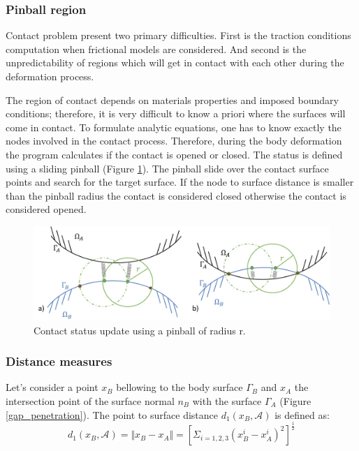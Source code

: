 
\subsubsection*{Pinball region}

Contact problem present two primary difficulties. First is the traction conditions computation when frictional models are considered. And second is the unpredictability of regions which will get in contact with each other during the deformation process.

The region of contact depends on materials properties and imposed boundary conditions; therefore, it is very difficult to know a priori where the surfaces will come in contact. To formulate analytic equations, one has to know exactly the nodes involved in the contact process. Therefore, during the body deformation the program calculates if the contact is opened or closed. The status is defined using a sliding pinball (Figure \ref{pinball}). The pinball slide over the contact surface points and search for the target surface. If the node to surface distance is smaller than the pinball radius the contact is considered closed otherwise the contact is considered opened.   

 \begin{center}
\begin{figure}
\centerline{\includegraphics[width=1\textwidth,keepaspectratio]{figures/pinball.jpg} }
\caption{Contact status update using a pinball of radius r.}
\label{pinball}
\end{figure}
\end{center}
 
 \subsubsection*{Distance measures} 
  Let's consider a point $x_B$ bellowing to the body surface $\Gamma_B$ and $x_A$ the intersection point of the surface normal $n_B$ with the surface $\Gamma_A$ (Figure \ref{gap_penetration}). The point to surface distance $d_1(x_B,\mathcal{A})$  is defined as:
\begin{equation}
\label{normalContactdistance}
d_1(x_B,\mathcal{A}) = \Vert x_B-x_A \Vert = \left[  \Sigma_{i={1,2,3}}\left( x_B^i - x_A^i \right)^2\right]^{\frac{1}{2}}
\end{equation}

